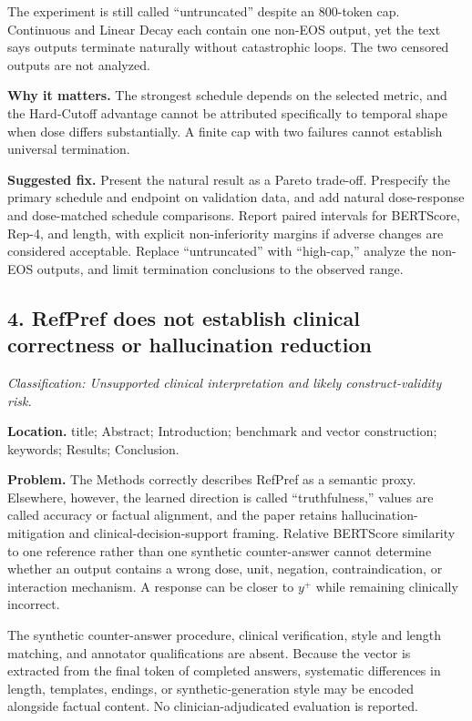 \documentclass[11pt]{article}
\newcommand{\findinglabel}[1]{\textbf{#1}}
\newcommand{\classification}[1]{\textit{Classification: #1.}}
\begin{document}
The experiment is still called ``untruncated'' despite an 800-token cap.  Continuous and Linear Decay each contain one non-EOS output, yet the text says outputs terminate naturally without catastrophic loops.  The two censored outputs are not analyzed.

\findinglabel{Why it matters.} The strongest schedule depends on the selected metric, and the Hard-Cutoff advantage cannot be attributed specifically to temporal shape when dose differs substantially.  A finite cap with two failures cannot establish universal termination.

\findinglabel{Suggested fix.} Present the natural result as a Pareto trade-off.  Prespecify the primary schedule and endpoint on validation data, and add natural dose-response and dose-matched schedule comparisons.  Report paired intervals for BERTScore, Rep-4, and length, with explicit non-inferiority margins if adverse changes are considered acceptable.  Replace ``untruncated'' with ``high-cap,'' analyze the non-EOS outputs, and limit termination conclusions to the observed range.

\subsection*{4. RefPref does not establish clinical correctness or hallucination reduction}

\classification{Unsupported clinical interpretation and likely construct-validity risk}

\findinglabel{Location.} title; Abstract; Introduction; benchmark and vector construction; keywords; Results; Conclusion.

\findinglabel{Problem.} The Methods correctly describes RefPref as a semantic proxy.  Elsewhere, however, the learned direction is called ``truthfulness,'' values are called accuracy or factual alignment, and the paper retains hallucination-mitigation and clinical-decision-support framing.  Relative BERTScore similarity to one reference rather than one synthetic counter-answer cannot determine whether an output contains a wrong dose, unit, negation, contraindication, or interaction mechanism.  A response can be closer to $y^+$ while remaining clinically incorrect.

The synthetic counter-answer procedure, clinical verification, style and length matching, and annotator qualifications are absent.  Because the vector is extracted from the final token of completed answers, systematic differences in length, templates, endings, or synthetic-generation style may be encoded alongside factual content.  No clinician-adjudicated evaluation is reported.
\end{document}
